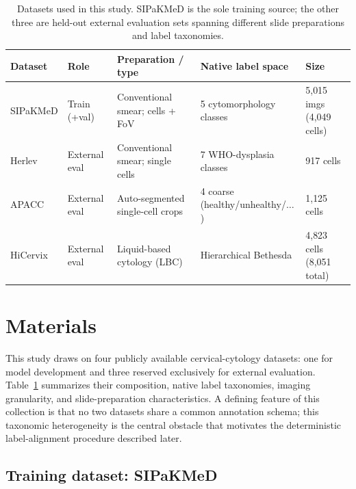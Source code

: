 \documentclass[twocolumn]{article}
\begin{document}
\begin{table}[t]
\caption{Datasets used in this study. SIPaKMeD is the sole training source; the other three are
held-out external evaluation sets spanning different slide preparations and label taxonomies.}
\label{tab:datasets}
\centering\small
\begin{tabular}{lllll}
\toprule
Dataset & Role & Preparation / type & Native label space & Size \\
\midrule
SIPaKMeD \citep{plissiti2018sipakmed} & Train (+val) & Conventional smear; cells + FoV & 5 cytomorphology classes & 5{,}015 imgs (4{,}049 cells) \\
Herlev \citep{jantzen2005herlev}      & External eval & Conventional smear; single cells & 7 WHO-dysplasia classes & 917 cells \\
APACC                                  & External eval & Auto-segmented single-cell crops & 4 coarse (healthy/unhealthy/$\dots$) & 1{,}125 cells \\
HiCervix \citep{cai2024hicervix}       & External eval & Liquid-based cytology (LBC) & Hierarchical Bethesda & 4{,}823 cells (8{,}051 total) \\
\bottomrule
\end{tabular}
\end{table}

\section{Materials}

This study draws on four publicly available cervical-cytology datasets: one for model development and three reserved exclusively for external evaluation. Table~\ref{tab:datasets} summarizes their composition, native label taxonomies, imaging granularity, and slide-preparation characteristics. A defining feature of this collection is that no two datasets share a common annotation schema; this taxonomic heterogeneity is the central obstacle that motivates the deterministic label-alignment procedure described later.

\subsection{Training dataset: SIPaKMeD}
\end{document}
